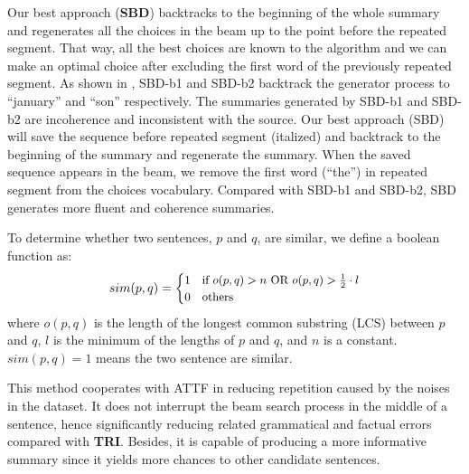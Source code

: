 Our best approach (\textbf{SBD}) backtracks to the beginning of the whole summary
and regenerates all the choices in the beam up to the point before
the repeated segment. That way, all the best choices are known to the
algorithm and we can make an optimal choice after excluding the first word
of the previously repeated segment. 
As shown in ,
SBD-b1 and SBD-b2 backtrack the generator process
to ``january'' and ``son'' respectively.
The summaries generated by SBD-b1 and SBD-b2 
are incoherence and inconsistent with the source.
Our best approach (SBD) will save the sequence before repeated segment (italized)
and backtrack to the beginning of the summary and regenerate the summary. 
When the saved sequence appears in the beam, we remove the first word (``the'') in 
repeated segment from the choices vocabulary. 
Compared with SBD-b1 and SBD-b2, SBD generates more fluent and coherence summaries.


To determine whether two sentences, 
$p$ and $q$, are similar, we define a boolean function as:
\begin{equation}\label{eq:s}
\small
	sim(p,q) = 
	\begin{cases}
		   1 &\mbox{if $o(p,q) > n\text{ OR }o(p,q) > \frac{1}{2}\cdot l$}\\
		   0 &\mbox{others}
   \end{cases}
\end{equation}
where $o(p,q)$ is the length of 
the longest common substring (LCS) between $p$ and $q$, 
$l$ is the minimum of the lengths of $p$ and $q$, and $n$ is a constant. 
$sim(p,q)=1$ means the two sentence are similar.

This method cooperates with ATTF in 
reducing repetition caused by the noises in the dataset.
It does not interrupt the beam search process in the middle of a sentence, 
hence significantly reducing related grammatical and factual errors 
compared with \textbf{TRI}.
Besides, it is capable of producing a more informative summary since
it yields more chances to other candidate sentences.
